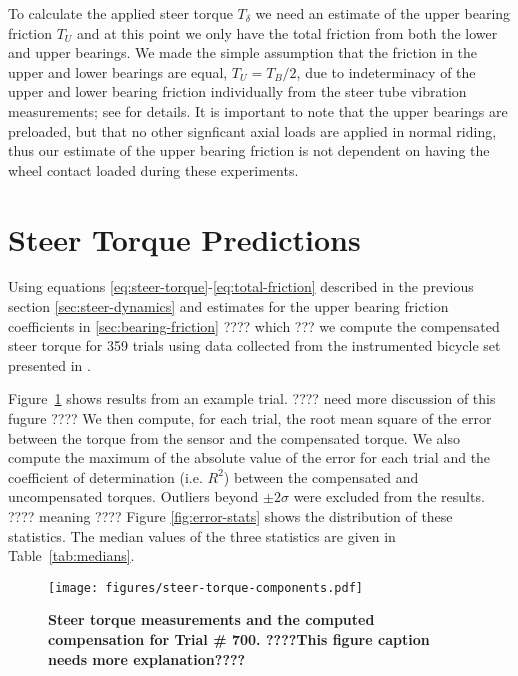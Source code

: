 \documentclass[10pt]{article}
\begin{document}
To calculate the applied steer torque $T_\delta$ we need an estimate of the
upper bearing friction $T_U$ and at this point we only have the total friction
from both the lower and upper bearings. We made the simple assumption that the
friction in the upper and lower bearings are equal, $T_U = T_B / 2$, due to
indeterminacy of the upper and lower bearing friction individually from the
steer tube vibration measurements; see \cite{Moore2012} for details. It is
important to note that the upper bearings are preloaded, but that no other
signficant axial loads are applied in normal riding, thus our estimate of the
upper bearing friction is not dependent on having the wheel contact loaded
during these experiments.


\section*{Steer Torque Predictions}

Using equations \ref{eq:steer-torque}-\ref{eq:total-friction} described in the
previous section \ref{sec:steer-dynamics} and estimates for the upper bearing
friction coefficients in \ref{sec:bearing-friction} ???? which ??? we compute
the compensated steer torque for 359 trials using data collected from the
instrumented bicycle set presented in \cite{Moore2012}.

Figure~\ref{fig:steer-torque-components} shows results from an example trial.
???? need more discussion of this fugure ????  We then compute, for each trial, the root mean
square of the error between the torque from the sensor and the compensated
torque. We also compute the maximum of the absolute value of the
error for each trial and the coefficient of determination (i.e. $R^2$) between
the compensated and uncompensated torques. Outliers beyond $\pm2 \sigma$ were
excluded from the results. ???? meaning ???? Figure \ref{fig:error-stats} shows
the distribution of these statistics. The median values of the three statistics
are given in Table~\ref{tab:medians}.

\begin{figure}
  \centering
  \texttt{[image: figures/steer-torque-components.pdf]}
  \caption{{\bf Steer torque measurements and the computed compensation for Trial \#
    700.  ????This figure caption needs more explanation????}}
  \label{fig:steer-torque-components}
\end{figure}
\end{document}
